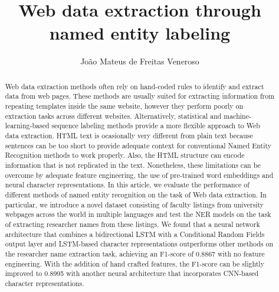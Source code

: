 \documentclass{nle}
\begin{document}
\title{Web data extraction through named entity labeling}

\author{João Mateus de Freitas Veneroso}
% 

\begin{abstract}

Web data extraction methods often rely on hand-coded rules to 
identify and extract data from web pages. These methods are usually
suited for extracting information from repeating templates inside
the same website, however they perform poorly on extraction 
tasks across different websites. Alternatively, statistical and 
machine-learning-based sequence labeling methods provide a more flexible 
approach to Web data extraction. HTML text is ocasionally very different 
from plain text because sentences can be too short to provide adequate 
context for conventional Named Entity Recognition methods to work 
properly. Also, the HTML structure can encode information that is not 
replicated in the text. Nonetheless, these limitations can be overcome by
adequate feature engineering, the use of pre-trained word 
embeddings and neural character representations. In this article, we 
evaluate the performance of different methods of named entity recognition 
on the task of Web data extraction. In particular, we introduce a novel 
dataset consisting of faculty listings from university webpages across
the world in multiple languages and test the NER models on the task of 
extracting researcher names from these listings. We found that a 
neural network architecture that combines a bidirectional LSTM with
a Conditional Random Fields output layer and LSTM-based character 
representations outperforms other methods on the researcher name 
extraction task, achieving an F1-score of 0.8867 with no feature engineering. 
With the addition of hand crafted features, the F1-score can be slightly 
improved to 0.8995 with another neural architecture that incorporates
CNN-based character representations.

\end{abstract}
\end{document}
